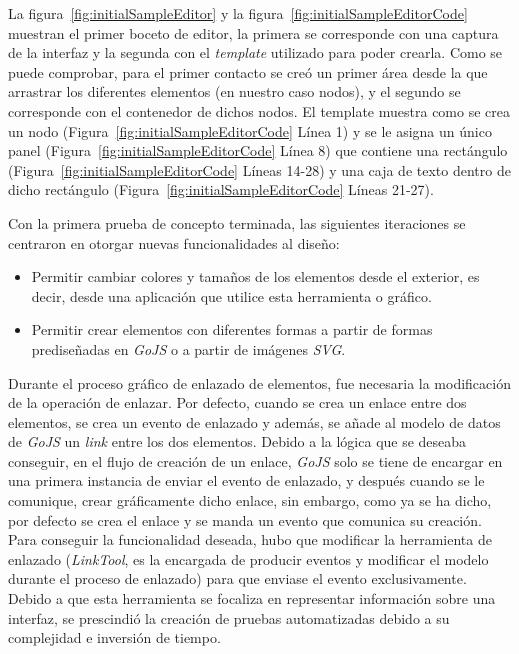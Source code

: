 La figura~\ref{fig:initialSampleEditor} y la figura~\ref{fig:initialSampleEditorCode} muestran el primer boceto de editor, la primera se corresponde con una captura de la interfaz y la segunda con el \emph{template} utilizado para poder crearla. Como se puede comprobar, para el primer contacto se creó un primer área desde la que arrastrar los diferentes elementos (en nuestro caso nodos), y el segundo se corresponde con el contenedor de dichos nodos. El template muestra como se crea un nodo (Figura~\ref{fig:initialSampleEditorCode} Línea 1) y se le asigna un único panel (Figura~\ref{fig:initialSampleEditorCode} Línea 8) que contiene una rectángulo (Figura~\ref{fig:initialSampleEditorCode} Líneas 14-28) y una caja de texto dentro de dicho rectángulo (Figura~\ref{fig:initialSampleEditorCode} Líneas 21-27).

Con la primera prueba de concepto terminada, las siguientes iteraciones se centraron en otorgar nuevas funcionalidades al diseño:
\begin{itemize}
	\item Permitir cambiar colores y tamaños de los elementos desde el exterior, es decir, desde una aplicación que utilice esta herramienta o gráfico.
	\item Permitir crear elementos con diferentes formas a partir de formas prediseñadas en \emph{GoJS} o a partir de imágenes \emph{SVG}\cite{svg}.
\end{itemize}

Durante el proceso gráfico de enlazado de elementos, fue necesaria la modificación de la operación de enlazar. Por defecto, cuando se crea un enlace entre dos elementos, se crea un evento de enlazado y además, se añade al modelo de datos de \emph{GoJS} un \emph{link} entre los dos elementos. Debido a la lógica que se deseaba conseguir, en el flujo de creación de un enlace, \emph{GoJS} solo se tiene de encargar en una primera instancia de enviar el evento de enlazado, y después cuando se le comunique, crear gráficamente dicho enlace, sin embargo, como ya se ha dicho, por defecto se crea el enlace y se manda un evento que comunica su creación. Para conseguir la funcionalidad deseada, hubo que modificar la herramienta de enlazado (\emph{LinkTool}, es la encargada de producir eventos y modificar el modelo durante el proceso de enlazado) para que enviase el evento exclusivamente.
Debido a que esta herramienta se focaliza en representar información sobre una interfaz, se prescindió la creación de pruebas automatizadas debido a su complejidad e inversión de tiempo. 

